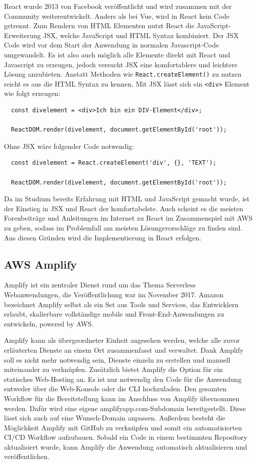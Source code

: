{React wurde 2013 von Facebook veröffentlicht und wird zusammen mit der Community weiterentwickelt.
Anders als bei Vue, wird in React kein Code getrennt.
Zum Rendern von HTML Elementen nutzt React die JavaScript-Erweiterung JSX, welche JavaScript und HTML Syntax kombiniert.
Der JSX Code wird vor dem Start der Anwendung in normalen Javascript-Code umgewandelt.
Es ist also auch möglich alle Elemente direkt mit React und Javascript zu erzeugen, jedoch versucht JSX eine komfortablere und leichtere Lösung anzubieten.
Anstatt Methoden wie \verb+React.createElement()+ zu nutzen reicht es aus die HTML Syntax zu kennen.
Mit JSX lässt sich ein \verb+<div>+ Element wie folgt erzeugen:
\begin{verbatim}
  const divelement = <div>Ich bin ein DIV-Element</div>;

  ReactDOM.render(divelement, document.getElementById('root'));
\end{verbatim}

Ohne JSX wäre folgender Code notwendig:
\begin{verbatim}
  const divelement = React.createElement('div', {}, 'TEXT');

  ReactDOM.render(divelement, document.getElementById('root'));
\end{verbatim}
\cite[]{JSX}

Da im Studium bereits Erfahrung mit HTML und JavaScript gemacht wurde, ist der Einstieg in JSX und React der komfortabelste.
Auch scheint es die meisten Forenbeiträge und Anleitungen im Internet zu React im Zusammenspiel mit AWS zu geben, sodass im Problemfall am meisten Lösungsvorschläge zu finden sind.
Aus diesen Gründen wird die Implementierung in React erfolgen.


\subsection{AWS Amplify}
\label{Amplify}

Amplify ist ein zentraler Dienst rund um das Thema Serverless Webanwendungen, die Veröffentlichung war im November 2017.
Amazon bezeichnet Amplify selbst als {}\glqq ein Set aus Tools und Services, das Entwicklern erlaubt, skalierbare vollständige
mobile und Front-End-Anwendungen zu entwickeln, powered by AWS.\grqq{}\cite[]{AWSAmplify}

Amplify kann als übergeordneter Einheit angesehen werden, welche alle zuvor erläuterten Dienste an einem Ort zusammenfasst und verwaltet.
Dank Amplify soll es nicht mehr notwendig sein, Dienste einzeln zu erstellen und manuell miteinander zu verknüpfen.
Zusätzlich bietet Amplify die Option für ein statisches Web-Hosting an.
Es ist nur notwendig den Code für die Anwendung entweder über die Web-Konsole oder die CLI hochzuladen.
Den gesamten Workflow für die Bereitstellung kann im Anschluss von Amplify übernommen werden.
Dafür wird eine eigene amplifyapp.com-Subdomain bereitgestellt.
Diese lässt sich auch auf eine Wunsch-Domain anpassen.
Außerdem besteht die Möglichkeit Amplify mit GitHub zu verknüpfen und somit ein automatisierten CI/CD Workflow aufzubauen.
Sobald ein Code in einem bestimmten Repository aktualisiert wurde, kann Amplify die Anwendung automatisch aktualisieren und veröffentlichen.
 \cite[]{AmplifyHosting}

}
